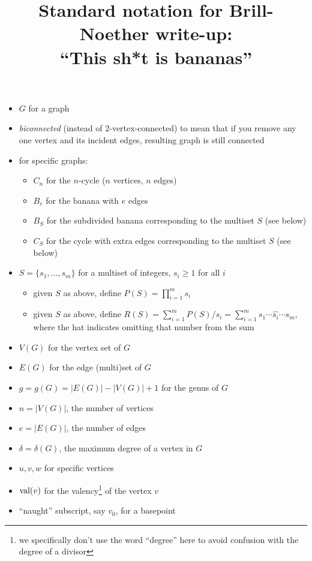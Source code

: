 \documentclass{amsart}
\title{Standard notation for Brill-Noether write-up: \\ ``This sh*t is bananas''}
\begin{document}
\maketitle

\begin{itemize}
\item $G$ for a graph
\item \emph{biconnected} (instead of 2-vertex-connected) to mean that if you remove any one vertex and its incident edges, resulting graph is still connected
\item for specific graphs:
\begin{itemize}
\item $C_n$ for the $n$-cycle ($n$ vertices, $n$ edges)
\item $B_e$ for the banana with $e$ edges
\item $B_S$ for the subdivided banana corresponding to the multiset $S$ (see below)
\item $C_S$ for the cycle with extra edges corresponding to the multiset $S$ (see below)
\end{itemize}

\item $S=\{s_1,\dots,s_m\}$ for a multiset of integers, $s_i\ge1$ for all $i$
\begin{itemize}
\item given $S$ as above, define $P(S)=\prod_{i=1}^ms_i$
\item given $S$ as above, define $R(S)=\sum_{i=1}^mP(S)/s_i=\sum_{i=1}^ms_1\cdots\widehat{s_i}\cdots s_m$, where the hat indicates omitting that number from the sum
\end{itemize}

\item $V(G)$ for the vertex set of $G$
\item $E(G)$ for the edge (multi)set of $G$
\item $g=g(G)=|E(G)|-|V(G)|+1$ for the genus of $G$
\item $n=|V(G)|$, the number of vertices
\item $e=|E(G)|$, the number of edges
\item $\delta=\delta(G)$, the maximum degree of a vertex in $G$
\item $u,v,w$ for specific vertices
\item $\operatorname{val}(v)$ for the valency\footnote{we specifically don't use the word ``degree'' here to avoid confusion with the degree of a divisor} of the vertex $v$
\item ``naught'' subscript, say $v_0$, for a basepoint


\end{itemize}
\end{document}
